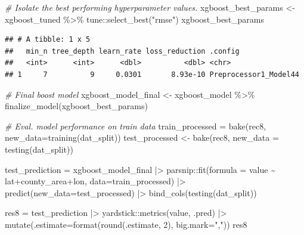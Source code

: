 \documentclass[
]{article}
\newenvironment{Shaded}{\begin{snugshade}}{\end{snugshade}}
\newcommand{\AttributeTok}[1]{\textcolor[rgb]{0.77,0.63,0.00}{#1}}
\newcommand{\CommentTok}[1]{\textcolor[rgb]{0.56,0.35,0.01}{\textit{#1}}}
\newcommand{\DecValTok}[1]{\textcolor[rgb]{0.00,0.00,0.81}{#1}}
\newcommand{\FunctionTok}[1]{\textcolor[rgb]{0.00,0.00,0.00}{#1}}
\newcommand{\NormalTok}[1]{#1}
\newcommand{\OtherTok}[1]{\textcolor[rgb]{0.56,0.35,0.01}{#1}}
\newcommand{\SpecialCharTok}[1]{\textcolor[rgb]{0.00,0.00,0.00}{#1}}
\newcommand{\StringTok}[1]{\textcolor[rgb]{0.31,0.60,0.02}{#1}}
\begin{document}
\begin{Shaded}
\begin{Highlighting}[]
\CommentTok{\# Isolate the best performing hyperparameter values.}
\NormalTok{xgboost\_best\_params }\OtherTok{\textless{}{-}}\NormalTok{ xgboost\_tuned }\SpecialCharTok{\%\textgreater{}\%}\NormalTok{ tune}\SpecialCharTok{::}\FunctionTok{select\_best}\NormalTok{(}\StringTok{"rmse"}\NormalTok{)}
\NormalTok{xgboost\_best\_params}
\end{Highlighting}
\end{Shaded}

\begin{verbatim}
## # A tibble: 1 x 5
##   min_n tree_depth learn_rate loss_reduction .config              
##   <int>      <int>      <dbl>          <dbl> <chr>                
## 1     7          9     0.0301       8.93e-10 Preprocessor1_Model44
\end{verbatim}

\begin{Shaded}
\begin{Highlighting}[]
\CommentTok{\# Final boost model}
\NormalTok{xgboost\_model\_final }\OtherTok{\textless{}{-}}\NormalTok{ xgboost\_model }\SpecialCharTok{\%\textgreater{}\%} \FunctionTok{finalize\_model}\NormalTok{(xgboost\_best\_params)}

\CommentTok{\# Eval. model performance on train data}
\NormalTok{train\_processed }\OtherTok{=} \FunctionTok{bake}\NormalTok{(rec8, }\AttributeTok{new\_data=}\FunctionTok{training}\NormalTok{(dat\_split))}
\NormalTok{test\_processed }\OtherTok{\textless{}{-}} \FunctionTok{bake}\NormalTok{(rec8, }\AttributeTok{new\_data =} \FunctionTok{testing}\NormalTok{(dat\_split))}

\NormalTok{test\_prediction }\OtherTok{=}\NormalTok{ xgboost\_model\_final }\SpecialCharTok{|\textgreater{}} 
\NormalTok{  parsnip}\SpecialCharTok{::}\FunctionTok{fit}\NormalTok{(}\AttributeTok{formula =}\NormalTok{ value }\SpecialCharTok{\textasciitilde{}}\NormalTok{ lat}\SpecialCharTok{+}\NormalTok{county\_area}\SpecialCharTok{+}\NormalTok{lon, }\AttributeTok{data=}\NormalTok{train\_processed) }\SpecialCharTok{|\textgreater{}} 
  \FunctionTok{predict}\NormalTok{(}\AttributeTok{new\_data=}\NormalTok{test\_processed) }\SpecialCharTok{|\textgreater{}} 
  \FunctionTok{bind\_cols}\NormalTok{(}\FunctionTok{testing}\NormalTok{(dat\_split))}

\NormalTok{res8 }\OtherTok{=}\NormalTok{ test\_prediction }\SpecialCharTok{|\textgreater{}} 
\NormalTok{  yardstick}\SpecialCharTok{::}\FunctionTok{metrics}\NormalTok{(value, .pred) }\SpecialCharTok{|\textgreater{}} 
  \FunctionTok{mutate}\NormalTok{(}\AttributeTok{.estimate=}\FunctionTok{format}\NormalTok{(}\FunctionTok{round}\NormalTok{(.estimate, }\DecValTok{2}\NormalTok{), }\AttributeTok{big.mark=}\StringTok{","}\NormalTok{))}
\NormalTok{res8}
\end{Highlighting}
\end{Shaded}
\end{document}
